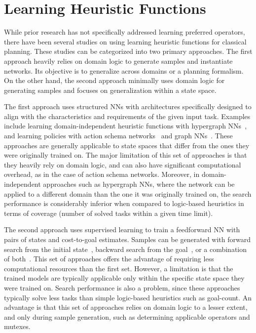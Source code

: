 \documentclass[ppgc,diss,english]{iiufrgs}
\newcommand{\pp}[2][noinline]{\todo[color=purple!50,linecolor={purple!100},#1,fancyline,author=Pedro]{#2}}
\begin{document}
\section{Learning Heuristic Functions}
\label{sec:related-h}
While prior research has not specifically addressed learning preferred operators, there have been several studies on using learning heuristic functions for classical planning. These studies can be categorized into two primary approaches.
The first approach heavily relies on domain logic to generate samples and instantiate networks. Its objective is to generalize across domains or a planning formalism.
On the other hand, the second approach minimally uses domain logic for generating samples and focuses on generalization within a state space.

The first approach uses structured NNs with architectures specifically designed to align with the characteristics and requirements of the given input task. Examples include learning domain-independent heuristic functions with hypergraph NNs~\cite{Shen.etal/2020}, and learning policies with action schema networks~\cite{Toyer.etal/2018,Toyer.etal/2020} and graph NNs~\cite{Stahlberg.etal/2022}. These approaches are generally applicable to state spaces that differ from the ones they were originally trained on. The major limitation of this set of approaches is that they heavily rely on domain logic, and can also have significant computational overhead, as in the case of action schema networks. Moreover, in domain-independent approaches such as hypergraph NNs, where the network can be applied to a different domain than the one it was originally trained on, the search performance is considerably inferior when compared to logic-based heuristics in terms of coverage (number of solved tasks within a given time limit).

The second approach uses supervised learning to train a feedforward NN with pairs of states and cost-to-goal estimates. Samples can be generated with forward search from the initial state~\cite{Ferber.etal/2020a}, backward search from the goal~\cite{Yu.etal/2020,OToole/2022,Bettker.etal/2022}, or a combination of both~\cite{Ferber.etal/2022}.
This set of approaches offers the advantage of requiring less computational resources than the first set. However, a limitation is that the trained models are typically applicable only within the specific state space they were trained on. Search performance is also a problem, since these approaches typically solve less tasks than simple logic-based heuristics such as goal-count. An advantage is that this set of approaches relies on domain logic to a lesser extent, and only during sample generation, such as determining applicable operators and mutexes. %
\end{document}
